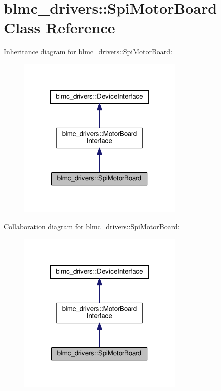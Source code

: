 \hypertarget{classblmc__drivers_1_1SpiMotorBoard}{}\section{blmc\+\_\+drivers\+:\+:Spi\+Motor\+Board Class Reference}
\label{classblmc__drivers_1_1SpiMotorBoard}


Inheritance diagram for blmc\+\_\+drivers\+:\+:Spi\+Motor\+Board\+:
\nopagebreak
\begin{figure}[H]
\begin{center}
\leavevmode
\includegraphics[width=227pt]{classblmc__drivers_1_1SpiMotorBoard__inherit__graph}
\end{center}
\end{figure}


Collaboration diagram for blmc\+\_\+drivers\+:\+:Spi\+Motor\+Board\+:
\nopagebreak
\begin{figure}[H]
\begin{center}
\leavevmode
\includegraphics[width=227pt]{classblmc__drivers_1_1SpiMotorBoard__coll__graph}
\end{center}
\end{figure}
